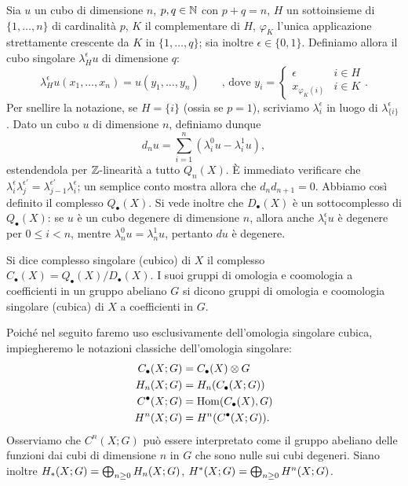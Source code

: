 Sia $u$ un cubo di dimensione $n$, $p,q\in\mathbb{N}$ con $p+q=n$, $H$ un sottoinsieme di $\{1,\ldots,n\}$ di cardinalità $p$, $K$ il complementare di $H$, $\varphi_K$ l'unica applicazione strettamente crescente da $K$ in $\{1,\ldots,q\}$; sia inoltre $\epsilon\in\{0,1\}$. Definiamo allora il cubo singolare $\lambda^\epsilon_Hu$ di dimensione $q$:
$$
\lambda^\epsilon_Hu(x_1,\ldots,x_n)=u(y_1,\ldots,y_n)\qquad\text{, dove }y_i=\begin{cases}\epsilon&i\in H\\x_{\varphi_K(i)}&i\in K\end{cases}.
$$
Per snellire la notazione, se $H=\{i\}$ (ossia se $p=1$), scriviamo $\lambda^\epsilon_i$ in luogo di $\lambda^\epsilon_{\{i\}}$. Dato un cubo $u$ di dimensione $n$, definiamo dunque
$$
d_nu=\sum_{i=1}^n(\lambda^0_iu-\lambda^1_iu),
$$
estendendola per $\mathbb{Z}$-linearità a tutto $Q_n(X)$. È immediato verificare che $\lambda^\epsilon_i\lambda^{\epsilon'}_j=\lambda^{\epsilon'}_{j-1}\lambda^\epsilon_i$; un semplice conto mostra allora che $d_nd_{n+1}=0$. Abbiamo così definito il complesso $Q_\bullet(X)$. Si vede inoltre che $D_\bullet(X)$ è un sottocomplesso di $Q_\bullet(X)$: se $u$ è un cubo degenere di dimensione $n$, allora anche $\lambda^\epsilon_iu$ è degenere per $0\le i<n$, mentre $\lambda^0_nu=\lambda^1_nu$, pertanto $du$ è degenere.
\begin{definition}
Si dice complesso singolare (cubico) di $X$ il complesso $C_\bullet(X)=Q_\bullet(X)/D_\bullet(X)$. I suoi gruppi di omologia e coomologia a coefficienti in un gruppo abeliano $G$ si dicono gruppi di omologia e coomologia singolare (cubica) di $X$ a coefficienti in $G$.
\end{definition}
Poiché nel seguito faremo uso esclusivamente dell'omologia singolare cubica, impiegheremo le notazioni classiche dell'omologia singolare: 
\begin{align*}
C_\bullet(X;G)&=C_\bullet(X)\mathbin{\otimes} G\\
H_n(X;G)&=H_n(C_\bullet(X;G))\\
C^\bullet(X;G)&=\operatorname{Hom}(C_\bullet(X),G)\\
H^n(X;G)&=H^n(C^\bullet(X;G)).
\end{align*}
Osserviamo che $C^n(X;G)$ può essere interpretato come il gruppo abeliano delle funzioni dai cubi di dimensione $n$ in $G$ che sono nulle sui cubi degeneri. Siano inoltre $H_*(X;G)=\bigoplus_{n\ge 0}H_n(X;G)$, $H^*(X;G)=\bigoplus_{n\ge 0}H^n(X;G)$.

